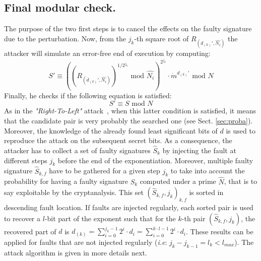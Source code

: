 \documentclass{article}
\begin{document}
\subsection{Final modular check.}
The purpose of the two first steps is to cancel the effects on the faulty signature due to the perturbation.
Now, from the $j_k$-th square root of $R_{(d_{(k)}',\hat{N_i})}$ the attacker will simulate an error-free end of execution by computing:
\begin{equation}
\label{eq:finalchk1}
 S' \equiv {\left({\left(R_{(d_{(k)}',\hat{N_i})}\right)}^{1/2^{j_k}} \mbox{ mod } \hat{N_i}\right)}^{{2}^{j_k}} 
 	   \cdot \dot{m}^{d_{(k)}'} \mbox{ mod } N
\end{equation}
Finally, he checks if the following equation is satisfied:
\begin{equation}
\label{eq:finalchk2}
 S' \equiv S \mbox{ mod } N
\end{equation}
As in the \textit{"Right-To-Left"} attack~\cite{77}, when this latter
condition is satisfied, it means that the candidate pair is very
probably the searched one (see Sect. \ref{sec:proba}). Moreover, the
knowledge of the already found least significant bits of $d$ is used
to reproduce the attack on the subsequent secret bits. As a
consequence, the attacker has to collect a set of faulty signatures
$\hat{S}_{k}$ by injecting the fault at different steps $j_k$ before
the end of the exponentiation. Moreover, multiple faulty signature
$\hat{S}_{k,f}$ have to be gathered for a given step $j_k$ to take
into account the probability for having a faulty signature
$\hat{S}_{k}$ computed under a prime $\hat{N}$, that is to say
exploitable by the cryptanalysis. 
This set $(\hat{S}_{k,f}, j_k)_{k,f}$ is sorted in descending fault
location. If faults are injected regularly, each sorted pair is used
to recover a $l$-bit part of the exponent such that for the $k$-th
pair $(\hat{S}_{k,f}, j_k)$, the recovered part of $d$  
is $d_{(k)} = {\sum}^{j_{k} -1}_{i=0} 2^i \cdot d_i = {\sum}^{k \cdot
  l -1}_{i=0} 2^i \cdot d_i$. These results can be applied for faults
that are not injected regularly (\textit{i.e}: $j_k - j_{k-1} = l_k <
l_{max}$). The attack algorithm is given in more details next.
\end{document}
